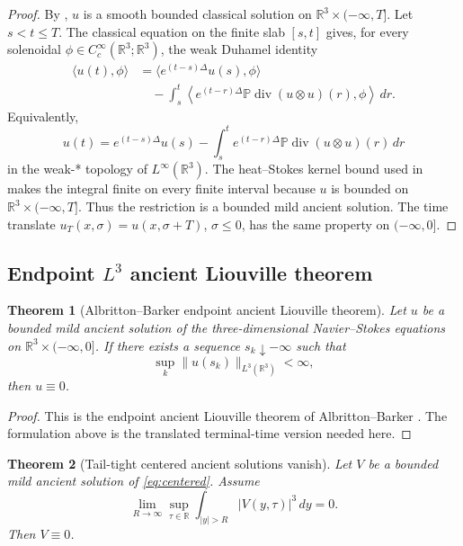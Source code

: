 \documentclass[11pt]{amsart}
\theoremstyle{plain}
\newtheorem{theorem}{Theorem}[section]
\theoremstyle{definition}
\theoremstyle{remark}
\numberwithin{equation}{section}
\newcommand{\R}{\mathbb R}
\newcommand{\divergence}{\operatorname{div}}
\begin{document}
\begin{proof}
By , \(u\) is a smooth bounded classical solution
on \(\R^3\times(-\infty,T]\).  Let \(s<t\le T\).  The classical equation on
the finite slab \([s,t]\) gives, for every solenoidal
\(\phi\in C_c^\infty(\R^3;\R^3)\), the weak Duhamel identity
\[
\begin{aligned}
   \langle u(t),\phi\rangle
   &=
   \langle e^{(t-s)\Delta}u(s),\phi\rangle \\
   &\quad
   -
   \int_s^t
   \left\langle
      e^{(t-r)\Delta}\mathbb P\divergence(u\otimes u)(r),
      \phi
   \right\rangle\,dr .
\end{aligned}
\]
Equivalently,
\[
   u(t)
   =
   e^{(t-s)\Delta}u(s)
   -
   \int_s^t
   e^{(t-r)\Delta}\mathbb P\divergence(u\otimes u)(r)\,dr
\]
in the weak-* topology of \(L^\infty(\R^3)\).  The heat--Stokes kernel bound
used in  makes the integral finite on every
finite interval because \(u\) is bounded on
\(\R^3\times(-\infty,T]\).  Thus the restriction is a bounded mild ancient
solution.  The time translate \(u_T(x,\sigma)=u(x,\sigma+T)\),
\(\sigma\le0\), has the same property on \((-\infty,0]\).
\end{proof}

\subsection{\texorpdfstring{Endpoint \(L^3\) ancient Liouville theorem}{Endpoint L3 ancient Liouville theorem}}

\begin{theorem}[Albritton--Barker endpoint ancient Liouville theorem]
\label{thm:AB-endpoint}
Let \(u\) be a bounded mild ancient solution of the three-dimensional
Navier--Stokes equations on \(\R^3\times(-\infty,0]\).  If there exists a
sequence \(s_k\downarrow-\infty\) such that
\[
   \sup_k\|u(s_k)\|_{L^3(\R^3)}<\infty,
\]
then \(u\equiv0\).
\end{theorem}

\begin{proof}
This is the endpoint ancient Liouville theorem of Albritton--Barker
\cite{AlbrittonBarker2019}.  The formulation above is the translated
terminal-time version needed here.
\end{proof}

\begin{theorem}[Tail-tight centered ancient solutions vanish]
\label{thm:tight-liouville}
Let \(V\) be a bounded mild ancient solution of \eqref{eq:centered}.  Assume
\[
   \lim_{R\to\infty}
   \sup_{\tau\in\R}\int_{|y|>R}|V(y,\tau)|^3\,dy=0 .
\]
Then \(V\equiv0\).
\end{theorem}
\end{document}
